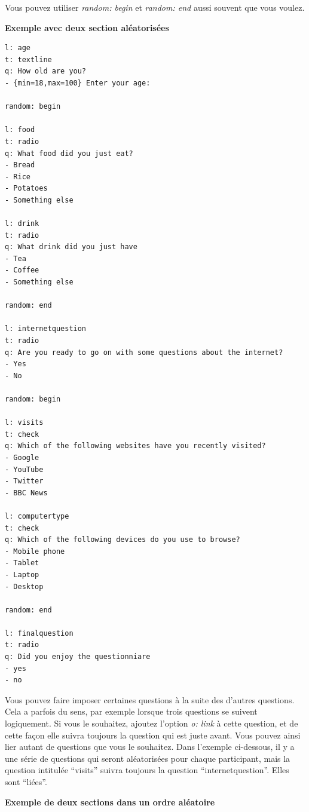 \documentclass[
]{book}
\begin{document}
Vous pouvez utiliser \emph{random: begin} et \emph{random: end} aussi souvent que vous voulez.

\textbf{Exemple avec deux section aléatorisées}

\begin{verbatim}
l: age
t: textline
q: How old are you?
- {min=18,max=100} Enter your age:

random: begin

l: food
t: radio
q: What food did you just eat?
- Bread
- Rice
- Potatoes
- Something else

l: drink
t: radio
q: What drink did you just have
- Tea
- Coffee
- Something else

random: end

l: internetquestion
t: radio
q: Are you ready to go on with some questions about the internet?
- Yes
- No

random: begin

l: visits
t: check
q: Which of the following websites have you recently visited?
- Google
- YouTube
- Twitter
- BBC News

l: computertype
t: check
q: Which of the following devices do you use to browse?
- Mobile phone
- Tablet
- Laptop
- Desktop

random: end

l: finalquestion
t: radio
q: Did you enjoy the questionniare
- yes
- no
\end{verbatim}

Vous pouvez faire imposer certaines questions à la suite des d'autres questions. Cela a parfois du sens, par exemple lorsque trois questions se suivent logiquement. Si vous le souhaitez, ajoutez l'option \emph{o: link} à cette question, et de cette façon elle suivra toujours la question qui est juste avant. Vous pouvez ainsi lier autant de questions que vous le souhaitez. Dans l'exemple ci-dessous, il y a une série de questions qui seront aléatorisées pour chaque participant, mais la question intitulée ``visits'' suivra toujours la question ``internetquestion''. Elles sont ``liées''.

\textbf{Exemple de deux sections dans un ordre aléatoire}
\end{document}
